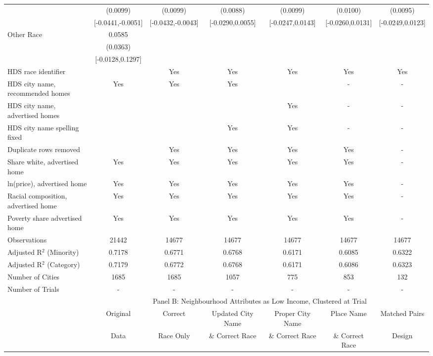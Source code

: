 \begin{table}[htbp]
{\begin{tabular}{l*{6}{c}}
 & (0.0099) & (0.0099) & (0.0088) & (0.0099) & (0.0100) & (0.0095) \\
 & [-0.0441,-0.0051] & [-0.0432,-0.0043] & [-0.0290,0.0055] & [-0.0247,0.0143] & [-0.0260,0.0131] & [-0.0249,0.0123] \\
Other Race & 0.0585 &  &  &  &  &  \\
 & (0.0363) &  &  &  &  &  \\
 & [-0.0128,0.1297] &  &  &  &  &  \\
\midrule
HDS race identifier & & Yes & Yes & Yes & Yes & Yes \\
HDS city name, recommended homes & Yes & Yes & Yes & & - & -\\
HDS city name, advertised homes &  &  &  & Yes & - & -\\
HDS city name spelling fixed & & & Yes & Yes & - & -\\
Duplicate rows removed &  & Yes & Yes & Yes & Yes & - \\
\midrule
Share white, advertised home  & Yes & Yes & Yes & Yes & Yes & - \\
ln(price), advertised home  & Yes & Yes & Yes & Yes & Yes & - \\
Racial composition, advertised home & Yes & Yes & Yes & Yes & Yes & - \\
Poverty share advertised home & Yes & Yes & Yes & Yes & Yes & - \\
Observations & 21442 & 14677 & 14677 & 14677 & 14677 & 14677 \\
Adjusted R$^2$ (Minority) & 0.7178 & 0.6771 & 0.6768 & 0.6171 & 0.6085 & 0.6322 \\
Adjusted R$^2$ (Category) & 0.7179 & 0.6772 & 0.6768 & 0.6171 & 0.6086 & 0.6323 \\
Number of Cities & 1685 & 1685 & 1057 & 775 & 853 & 132 \\
Number of Trials & - & - & - & - & - & - \\
\bottomrule
\toprule
& \multicolumn{6}{c}{Panel B: Neighbourhood Attributes as Low Income, Clustered at Trial}\\
\toprule
                    &\multicolumn{1}{c}{Original}&\multicolumn{1}{c}{Correct}&\multicolumn{1}{c}{Updated City Name}&\multicolumn{1}{c}{Proper City Name}&\multicolumn{1}{c}{Place Name}&\multicolumn{1}{c}{Matched Pairs}\\
                      &\multicolumn{1}{c}{Data}&\multicolumn{1}{c}{Race Only}&\multicolumn{1}{c}{\& Correct Race}&\multicolumn{1}{c}{\& Correct Race}&\multicolumn{1}{c}{\& Correct Race}&\multicolumn{1}{c}{Design}\\                  

\end{tabular}}
\end{table}
